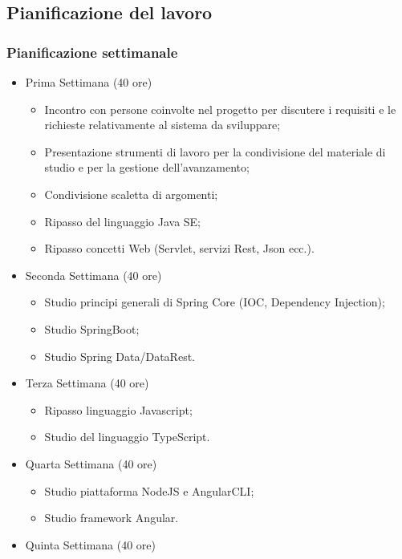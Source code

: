 \subsection{Pianificazione del lavoro}
\subsubsection*{Pianificazione settimanale}
\begin{itemize}
    \item Prima Settimana (40 ore)
    \begin{itemize}
        \item Incontro con persone coinvolte nel progetto per discutere i requisiti e le richieste relativamente
        al sistema da sviluppare;
        \item Presentazione strumenti di lavoro per la condivisione del materiale di studio e per la gestione
        dell'avanzamento;
        \item Condivisione scaletta di argomenti;
        \item Ripasso del linguaggio Java SE;
        \item Ripasso concetti Web (Servlet, servizi Rest, Json ecc.).
    \end{itemize}
    \item Seconda Settimana (40 ore)
        \begin{itemize}
            \item Studio principi generali di Spring Core (IOC, Dependency Injection);
            \item Studio SpringBoot;
            \item Studio Spring Data/DataRest.
        \end{itemize}
    \item Terza Settimana (40 ore)
        \begin{itemize}
            \item Ripasso linguaggio Javascript;
            \item Studio del linguaggio TypeScript.
        \end{itemize}
    \item Quarta Settimana (40 ore)
        \begin{itemize}
            \item Studio piattaforma NodeJS e AngularCLI;
            \item Studio framework Angular.
        \end{itemize}
    \item Quinta Settimana (40 ore)

\end{itemize}

